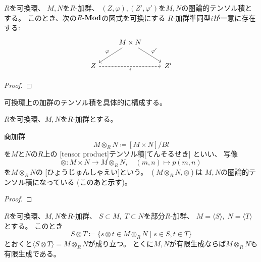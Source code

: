 \documentclass[report]{jlreq}
\begin{document}
\begin{remark}
\end{remark}

\begin{theorem}[圏論的テンソル積の一意性]
    $R$を可換環、
    $M, N$を$R$-加群、
    $(Z, \varphi), (Z', \varphi')$を$M, N$の圏論的テンソル積とする。
    このとき、次の$R\text{-}\mathbf{Mod}$の図式を可換にする
    $R$-加群準同型$i$が一意に存在する:
    \begin{equation}
        \begin{tikzcd}
            & M \times N
                \ar{ld}[swap]{\varphi}
                \ar{rd}{\varphi'} \\
            Z
                \ar[dashed]{rr}[swap]{i}
                & & Z'
        \end{tikzcd}
    \end{equation}
\end{theorem}

\begin{proof}
    \TODO{}
\end{proof}

可換環上の加群のテンソル積を具体的に構成する。

\begin{definition}[可換環上の加群のテンソル積の構成]
    $R$を可換環、$M, N$を$R$-加群とする。

    \TODO{}

    商加群
    \begin{equation}
        M \otimes_R N \coloneqq [M \times N] / Bl
    \end{equation}
    を$M$と$N$の$R$上の
    [tensor product]{テンソル積}[てんそるせき]
    といい、
    写像
    \begin{equation}
        \otimes \colon M \times N \to M \otimes_R N,
        \quad
        (m, n) \mapsto p(m, n)
    \end{equation}
    を$M \otimes_R N$の
    [ひょうじゅんしゃえい]という。
    $(M \otimes_R N, \otimes)$は
    $M, N$の圏論的テンソル積になっている (このあと示す)。
\end{definition}

\begin{proof}
    \TODO{}
\end{proof}

\begin{theorem}[有限生成加群のテンソル積の生成系]
    $R$を可換環、$M, N$を$R$-加群、
    $S \subset M, \; T \subset N$を部分$R$-加群、
    $M = \langle S \rangle, \; N = \langle T \rangle$
    とする。
    このとき
    \begin{equation}
        S \otimes T \coloneqq \{
            s \otimes t \in M \otimes_R N
            \mid
            s \in S, t \in T
        \}
    \end{equation}
    とおくと$\langle S \otimes T \rangle = M \otimes_R N$が成り立つ。
    とくに$M, N$が有限生成ならば$M \otimes_R N$も有限生成である。
\end{theorem}
\end{document}
